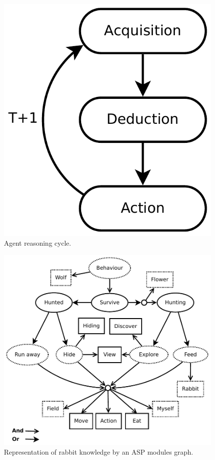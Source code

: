 \documentclass{aamas2012}
\begin{document}
	\begin{figure}
		\centering
		\includegraphics[keepaspectratio=true, scale=0.4]{framework.pdf}
		\caption
		{
			\label{framework_figure}
			Agent reasoning cycle.
		}
	\end{figure}

	\begin{figure}
		\centering
		\includegraphics[keepaspectratio=true, scale=0.5]{modular_knowledge.pdf}
		\caption
		{
			\label{modular_knowledge}
			Representation of rabbit knowledge by an ASP modules graph.
		}
	\end{figure}
	
\end{document}
